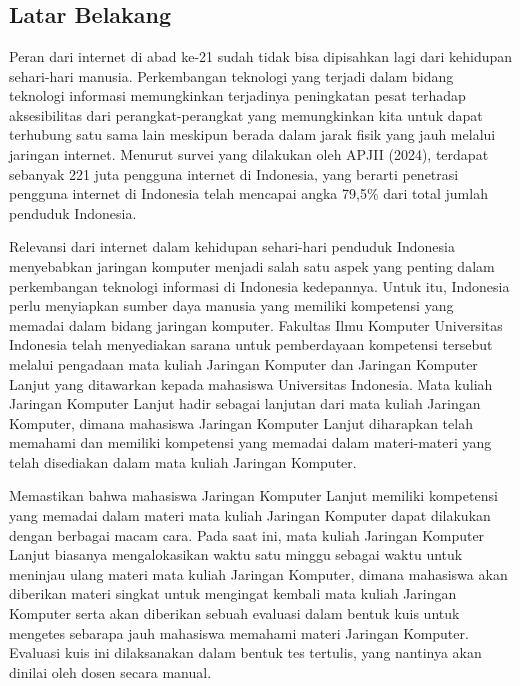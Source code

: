 \chapter{\babSatu}
\label{bab:1}


\section{Latar Belakang}
\label{sec:latarBelakang}
Peran dari internet di abad ke-21 sudah tidak bisa dipisahkan lagi dari kehidupan sehari-hari manusia. Perkembangan teknologi yang terjadi
dalam bidang teknologi informasi memungkinkan terjadinya peningkatan pesat terhadap aksesibilitas dari perangkat-perangkat yang memungkinkan kita untuk
dapat terhubung satu sama lain meskipun berada dalam jarak fisik yang jauh melalui jaringan internet. Menurut survei yang dilakukan oleh APJII (2024),
terdapat sebanyak 221 juta pengguna internet di Indonesia, yang berarti penetrasi pengguna internet di Indonesia telah mencapai angka 79,5\% dari total
jumlah penduduk Indonesia. 
\par

Relevansi dari internet dalam kehidupan sehari-hari penduduk Indonesia menyebabkan jaringan komputer menjadi salah satu aspek yang penting dalam perkembangan
teknologi informasi di Indonesia kedepannya. Untuk itu, Indonesia perlu menyiapkan sumber daya manusia yang memiliki kompetensi yang memadai dalam bidang
jaringan komputer. Fakultas Ilmu Komputer Universitas Indonesia telah menyediakan sarana untuk pemberdayaan kompetensi tersebut melalui pengadaan
mata kuliah Jaringan Komputer dan Jaringan Komputer Lanjut yang ditawarkan kepada mahasiswa Universitas Indonesia. Mata kuliah Jaringan Komputer Lanjut
hadir sebagai lanjutan dari mata kuliah Jaringan Komputer, dimana mahasiswa Jaringan Komputer Lanjut diharapkan telah memahami dan memiliki kompetensi
yang memadai dalam materi-materi yang telah disediakan dalam mata kuliah Jaringan Komputer.
\par

Memastikan bahwa mahasiswa Jaringan Komputer Lanjut memiliki kompetensi yang memadai dalam materi mata kuliah Jaringan Komputer dapat dilakukan dengan berbagai macam cara.
Pada saat ini, mata kuliah Jaringan Komputer Lanjut biasanya mengalokasikan waktu satu minggu sebagai waktu untuk meninjau ulang materi mata kuliah
Jaringan Komputer, dimana mahasiswa akan diberikan materi singkat untuk mengingat kembali mata kuliah Jaringan Komputer serta akan diberikan sebuah evaluasi
dalam bentuk kuis untuk mengetes sebarapa jauh mahasiswa memahami materi Jaringan Komputer. Evaluasi kuis ini dilaksanakan dalam bentuk tes tertulis, yang nantinya
akan dinilai oleh dosen secara manual. 
\par

